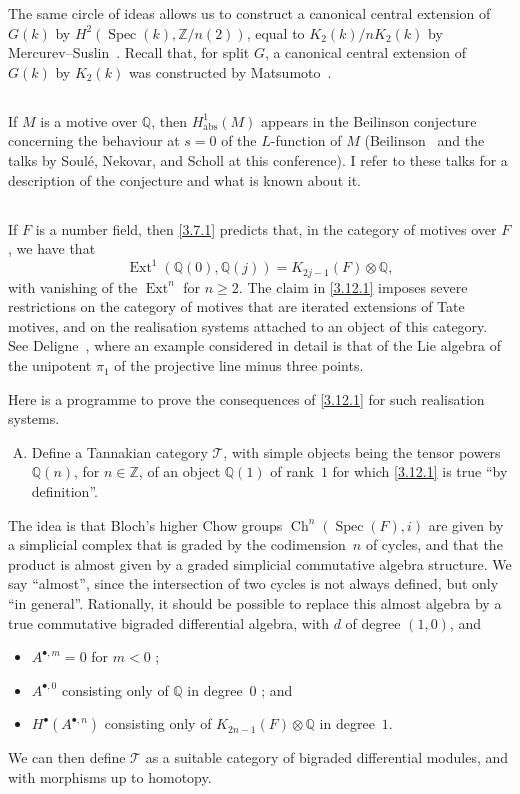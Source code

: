\documentclass{article}
\theoremstyle{plain}
\theoremstyle{definition}
\newcommand{\sh}[1]{{\mathscr{#1}}}
\newcommand{\ZZ}{\mathbb{Z}}
\newcommand{\QQ}{\mathbb{Q}}
\newcommand{\abs}{\mathrm{abs}}
\renewcommand{\geq}{\geqslant}
\DeclareMathOperator{\Ext}{Ext}
\DeclareMathOperator{\Spec}{Spec}
\DeclareMathOperator{\Ch}{Ch}
\newcommand{\oldpage}[1]{\marginpar{\footnotesize$\Big\vert$ \textit{p.~#1}}}
\begin{document}
The same circle of ideas allows us to construct a canonical central extension of $G(k)$ by $H^2(\Spec(k),\ZZ/n(2))$, equal to $K_2(k)/nK_2(k)$ by Mercurev--Suslin~\cite{27}.
Recall that, for split $G$, a canonical central extension of $G(k)$ by $K_2(k)$ was constructed by Matsumoto~\cite[5.11]{25}.


\subsection{}
\label{3.11}

If $M$ is a motive over $\QQ$, then $H_\abs^1(M)$ appears in the Beilinson conjecture concerning the behaviour at $s=0$ of the $L$-function of $M$ (Beilinson~\cite{2} and the talks by Soul\'{e}, Nekovar, and Scholl at this conference).
I refer to these talks for a description of the conjecture and what is known about it.


\subsection{}
\label{3.12}

If $F$ is a number field, then \cref{3.7.1} predicts that, in the category of motives over $F$, we have that
\[
\label{3.12.1}
  \Ext^1(\QQ(0),\QQ(j)) = K_{2j-1}(F)\otimes\QQ,
\tag{3.12.1}
\]
with vanishing of the $\Ext^n$ for $n\geq2$.
The claim in \cref{3.12.1} imposes severe restrictions on the category of motives that are iterated extensions of Tate motives, and on the realisation systems attached to an object of this category.
See Deligne~\cite{14}, where an example considered in detail is that of the Lie algebra of the unipotent $\pi_1$ of the projective line minus three points.

\oldpage{160}
Here is a programme to prove the consequences of \cref{3.12.1} for such realisation systems.
\begin{enumerate}[(A)]
  \item Define a Tannakian category $\sh{T}$, with simple objects being the tensor powers $\QQ(n)$, for $n\in\ZZ$, of an object $\QQ(1)$ of rank~$1$ for which \cref{3.12.1} is true ``by definition''.
\end{enumerate}

The idea is that Bloch's higher Chow groups $\Ch^n(\Spec(F),i)$ are given by a simplicial complex that is graded by the codimension~$n$ of cycles, and that the product is almost given by a graded simplicial commutative algebra structure.
We say ``almost'', since the intersection of two cycles is not always defined, but only ``in general''.
Rationally, it should be possible to replace this almost algebra by a true commutative bigraded differential algebra, with $d$ of degree $(1,0)$, and
\begin{itemize}
  \item $A^{\bullet,m}=0$ for $m<0$ ;
  \item $A^{\bullet,0}$ consisting only of $\QQ$ in degree~$0$ ; and
  \item $H^\bullet(A^{\bullet,n})$ consisting only of $K_{2n-1}(F)\otimes\QQ$ in degree~$1$.
\end{itemize}
We can then define $\sh{T}$ as a suitable category of bigraded differential modules, and with morphisms up to homotopy.
\end{document}
